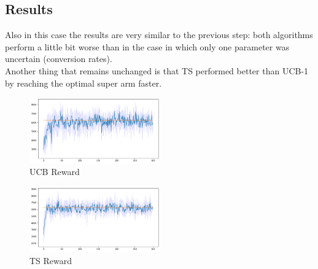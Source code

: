\subsection{Results}
Also in this case the results are very similar to the previous step: both algorithms perform a little bit worse than in the case in which only one parameter was uncertain (conversion rates).\\ Another thing that remains unchanged is that TS performed better than UCB-1 by reaching the optimal super arm faster.
\begin{multicols}{2}
    \begin{figure}[H]
        \begin{center}
        \includegraphics[width=0.5\textwidth]{img/ucb_reward5.png}
        \caption{UCB Reward}
        \label{fig:reward51}
        \end{center}
    \end{figure}
    \columnbreak
    \begin{figure}[H]
        \begin{center}
        \includegraphics[width=0.5\textwidth]{img/ts_reward5.png}
        \caption{TS Reward}
        \label{fig:reward52}
        \end{center}
    \end{figure}
\end{multicols}

